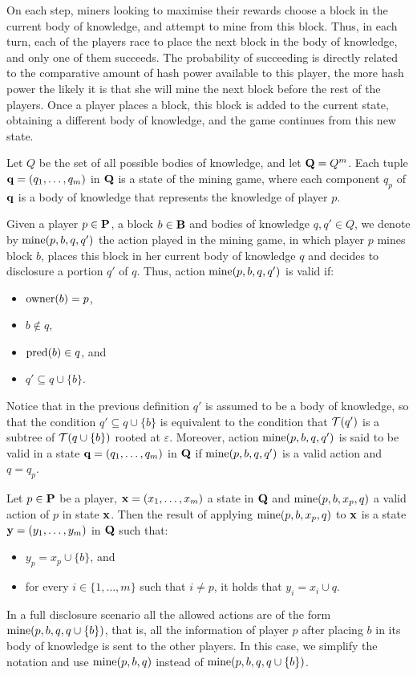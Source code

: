 \documentclass{article}
\begin{document}
On each step, miners looking to maximise their rewards choose a block in the current body of knowledge, and attempt to mine from this block. Thus, in each turn, each of the players race to place the next block in the body of knowledge, and only one of them succeeds. The probability of succeeding is directly related to the comparative amount of hash power available to this player, the more hash power the likely it is that she will mine the next block before the rest of the players. Once a player places a block, this block is added to the current state, obtaining a different body of knowledge, and the game continues from this new state. 

Let $Q$ be the set of all possible bodies of knowledge, and let $\mathbf{Q} = Q^m$. Each tuple $\mathbf{q} = (q_1, \ldots, q_m)$ in $\mathbf{Q}$ is a state of the mining game, where each component $q_p$ of $\mathbf{q}$ is a body of knowledge that represents the knowledge of player $p$.

Given a player $p \in \mathbf{P}$, a block $b \in \mathbf{B}$ and bodies of knowledge $q, q' \in Q$, we denote by $\text{mine}(p,b,q,q')$ the action played in the mining game, in which player $p$ mines block $b$, places this block in her current body of knowledge $q$ and decides to disclosure a portion $q'$ of $q$. Thus, action $\text{mine}(p,b,q,q')$ is valid if:
\begin{itemize}
\item $\text{owner}(b) = p$,

\item $b \not\in q$,

\item $\text{pred}(b) \in q$, and

\item $q' \subseteq q \cup \{b\}$.
\end{itemize}
Notice that in the previous definition $q'$ is assumed to be a body of knowledge, so that the condition $q' \subseteq q \cup \{b\}$ is equivalent to the condition that $\mathcal{T}(q')$ is a subtree of $\mathcal{T}(q \cup \{b\})$ rooted at $\varepsilon$. Moreover, action $\text{mine}(p,b,q,q')$ is said to be valid in a state $\mathbf{q} = (q_1, \ldots, q_m)$ in $\mathbf{Q}$ if $\text{mine}(p,b,q,q')$ is a valid action and $q = q_p$.

Let $p \in \mathbf{P}$ be a player, $\mathbf{x} =  (x_1, \ldots, x_m)$ a state in $\mathbf{Q}$ and $\text{mine}(p,b,x_p,q)$ a valid action of $p$ in state $\mathbf{x}$. Then the result of applying $\text{mine}(p,b,x_p,q)$ to $\mathbf{x}$ is a state $\mathbf{y} = (y_1, \ldots, y_m)$ in $\mathbf{Q}$ such that:
\begin{itemize}
\item $y_p = x_p \cup \{b\}$, and

\item for every $i \in \{1, \ldots, m\}$ such that $i \neq p$, it holds that $y_i = x_i \cup q$.
\end{itemize}
In a full disclosure scenario all the allowed actions are of the form $\text{mine}(p,b,q,q \cup \{b\})$, that is, all the information of player $p$ after placing $b$ in its body of knowledge is sent to the other players. In this case, we simplify the notation and use $\text{mine}(p,b,q)$ instead of $\text{mine}(p,b,q,q\cup \{b\})$.
\end{document}
